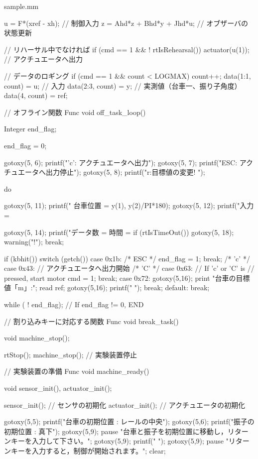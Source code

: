 \begin{breakitembox}[l]{sample.mm}
\begin{verbatimtab}[4]
{	u = F*(xref - xh); // 制御入力
	z = Ahd*z + Bhd*y + Jhd*u; // オブザーバの状態更新

	// リハーサル中でなければ
	if (cmd == 1 && ! rtIsRehearsal()) {
		actuator(u(1));	 		// アクチュエータへ出力
	}

	// データのロギング
	if (cmd == 1 && count < LOGMAX) {
		count++;
		data(1:1, count) = u; // 入力
		data(2:3, count) = y; // 実測値（台車一、振り子角度）
		data(4, count)  = ref;
	}
}

// オフライン関数
Func void off_task_loop()
{
	Integer end_flag;

	end_flag = 0;

	gotoxy(5, 6);
	printf("'c': アクチュエータへ出力");
	gotoxy(5, 7);
	printf("ESC: アクチュエータへ出力停止");
	gotoxy(5, 8);
	printf("r:目標値の変更! ");

	do {
		gotoxy(5, 11);
		printf("  台車位置 = %
			y(1), y(2)/PI*180);
		gotoxy(5, 12);
		printf("入力 = %

		gotoxy(5, 14);
		printf("データ数 = %
				時間 = %
		if (rtIsTimeOut()) {
			gotoxy(5, 18);
			warning(" !\n");
			break;
		}

		if (kbhit()) {
			switch (getch()) {
			  case 0x1b:            /* ESC */
				end_flag = 1;
				break;
		/* 'c' */  case 0x43: // アクチュエータへ出力開始
		/* 'C' */  case 0x63: // If 'c' or 'C' is 
				      // pressed, start motor
				cmd = 1;
				break;
			   case 0x72:
			   	gotoxy(5,16);
				print "台車の目標値「m」:"; read ref;
				gotoxy(5,16);
				printf("  				");
				break;
			  default:
				break;
			}
		}
    } while ( ! end_flag);  // If end_flag != 0, END
}

// 割り込みキーに対応する関数
Func void break_task()
{
	void machine_stop();

	rtStop();
	machine_stop(); // 実験装置停止
}

// 実験装置の準備
Func void machine_ready()
{
	void sensor_init(), actuator_init();

	sensor_init();                  // センサの初期化
	actuator_init();                // アクチュエータの初期化

	gotoxy(5,5);
	printf("台車の初期位置 : レールの中央");
	gotoxy(5,6);
	printf("振子の初期位置 : 真下");
	gotoxy(5,9);
	pause "台車と振子を初期位置に移動し，リターンキーを入力して下さい。";
	gotoxy(5,9);
	printf("                                         ");
	gotoxy(5,9);
	pause "リターンキーを入力すると，制御が開始されます。";
	clear;
}


\end{verbatimtab}
\end{breakitembox}
